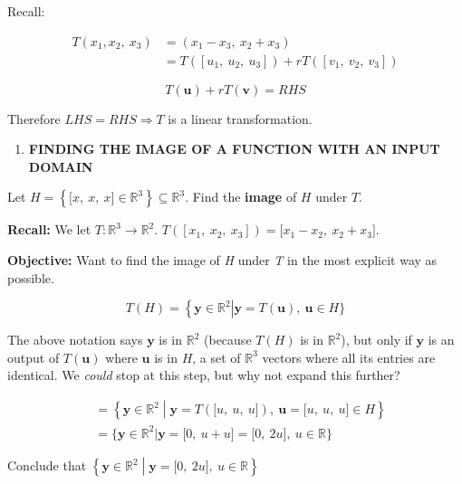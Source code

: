\documentclass[12pt]{article}
\theoremstyle{plain}
\theoremstyle{remark}
\theoremstyle{definition}
\begin{document}
Recall:

\begin{align*}
T\left( x_{1},x_{2},\ x_{3} \right) &= \left( x_{1} - x_{3},\ x_{2} + x_{3} \right) \\
&= T\left( \left\lbrack u_{1},\ u_{2},\ u_{3} \right\rbrack \right) + rT\left( \left\lbrack v_{1},\ v_{2},\ v_{3} \right\rbrack \right)
\end{align*}


\[T\left( \mathbf{u} \right) + rT\left( \mathbf{v} \right) = RHS\]

Therefore \(LHS = RHS \Rightarrow T\) is a linear transformation.

\begin{enumerate}
\def\labelenumi{\arabic{enumi}.}
\setcounter{enumi}{1}
\item
  \textbf{FINDING THE IMAGE OF A FUNCTION WITH AN INPUT DOMAIN}
\end{enumerate}

Let
\(H = \left\{ \lbrack x,\ x,\ x\rbrack \in \mathbb{R}^{3} \right\} \subseteq \mathbb{R}^{3}\).
Find the \textbf{image} of \(H\) under \(T\).

\textbf{Recall:} We let \(T:\mathbb{R}^{3} \rightarrow \mathbb{R}^{2}\).
\(T\left( \left\lbrack x_{1},\ x_{2},\ x_{3} \right\rbrack \right) = \lbrack x_{1} - x_{2},\ x_{2} + x_{3}\rbrack\).

\textbf{Objective:} Want to find the image of \emph{H} under \emph{T} in
the most explicit way as possible.

\[T(H) = \left\{ \mathbf{y} \in \mathbb{R}^{2} \right|\mathbf{y} = T\left( \mathbf{u} \right),\ \mathbf{u} \in H\}\]

The above notation says \(\mathbf{y}\) is in \(\mathbb{R}^{2}\)
(because \(T(H)\) is in \(\mathbb{R}^{2}\)), but only if
\(\mathbf{y}\) is an output of \(T(\mathbf{u})\) where
\(\mathbf{u}\) is in \(H\), a set of \(\mathbb{R}^{3}\) vectors
where all its entries are identical. We \emph{could} stop at this step,
but why not expand this further?

\begin{align*}
&= \left\{ \mathbf{y} \in \mathbb{R}^{2} \middle| \mathbf{y} = T\left( \lbrack u,\ u,\ u\rbrack \right),\ \mathbf{u} = \lbrack u,\ u,\ u\rbrack \in H \right\} \\
&= \{\mathbf{y} \in \mathbb{R}^{2}|\mathbf{y} = \lbrack 0,\ u + u\rbrack = \lbrack 0,\ 2u\rbrack,\ u\mathbb{\in R\}}
\end{align*}


Conclude that
\(\left\{ \mathbf{y} \in \mathbb{R}^{2} \middle| \mathbf{y} = \lbrack 0,\ 2u\rbrack,\ u\mathbb{\in R} \right\}\)
\end{document}
